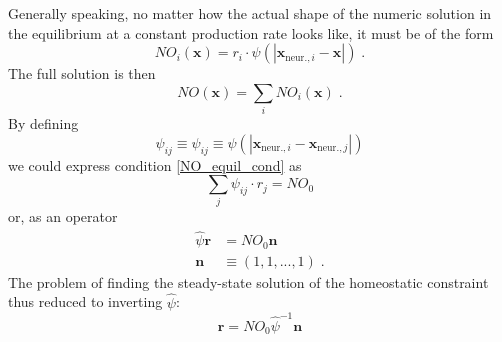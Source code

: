 \documentclass[10pt,letterpaper]{article}
\begin{document}
Generally speaking, no matter how the actual shape of the numeric solution in the equilibrium at a constant production rate looks like, it must be of the form
\begin{equation}
NO_i(\mathbf{x}) = r_i \cdot \psi (|\mathbf{x}_{\mathrm{neur.},i}-\mathbf{x}|) \;  . \label{general_diff_interaction}
\end{equation}
The full solution is then
\begin{equation}
NO(\mathbf{x}) = \sum_i NO_i(\mathbf{x})\;.
\label{full_sol_diff_equil}
\end{equation}
By defining
\begin{equation}
\psi_{ij} \equiv \psi_{ij} \equiv \psi (|\mathbf{x}_{\mathrm{neur.},i}-\mathbf{x}_{\mathrm{neur.},j}|)
\label{interact_matrix_elements}
\end{equation}
we could express condition \eqref{NO_equil_cond} as
\begin{equation}
\sum_j \psi_{ij}\cdot r_j = NO_0
\label{NO_equil_cond_interact_matrix}
\end{equation}
or, as an operator
\begin{align}
\hat{\psi}\mathbf{r} &= NO_0 \mathbf{n} \label{NO_equil_cond_interact_matrix_operator} \\
\mathbf{n}&\equiv (1,1,...,1) \; .
\end{align}
The problem of finding the steady-state solution of the homeostatic constraint thus reduced to inverting $\hat{\psi}$:
\begin{equation}
\mathbf{r} = NO_0 \hat{\psi}^{-1} \mathbf{n}
\label{NO_euqil_cond_interact_matrix_operator_solve}
\end{equation}
\end{document}
